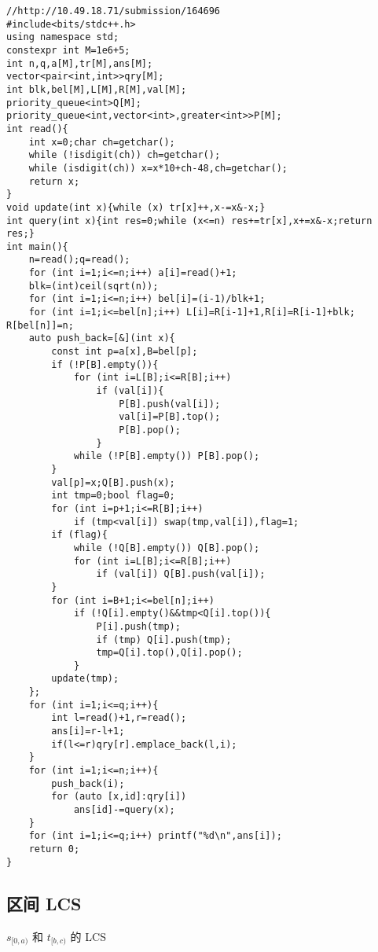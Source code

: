 \documentclass[12pt]{ctexart}
\begin{document}
\begin{lstlisting}
//http://10.49.18.71/submission/164696
#include<bits/stdc++.h>
using namespace std;
constexpr int M=1e6+5;
int n,q,a[M],tr[M],ans[M];
vector<pair<int,int>>qry[M];
int blk,bel[M],L[M],R[M],val[M];
priority_queue<int>Q[M];
priority_queue<int,vector<int>,greater<int>>P[M];
int read(){
    int x=0;char ch=getchar();
    while (!isdigit(ch)) ch=getchar();
    while (isdigit(ch)) x=x*10+ch-48,ch=getchar();
    return x;
}
void update(int x){while (x) tr[x]++,x-=x&-x;}
int query(int x){int res=0;while (x<=n) res+=tr[x],x+=x&-x;return res;}
int main(){
	n=read();q=read();
    for (int i=1;i<=n;i++) a[i]=read()+1;
	blk=(int)ceil(sqrt(n));
	for (int i=1;i<=n;i++) bel[i]=(i-1)/blk+1;
	for (int i=1;i<=bel[n];i++) L[i]=R[i-1]+1,R[i]=R[i-1]+blk; R[bel[n]]=n;
    auto push_back=[&](int x){
		const int p=a[x],B=bel[p];
		if (!P[B].empty()){
			for (int i=L[B];i<=R[B];i++)
				if (val[i]){
					P[B].push(val[i]);
					val[i]=P[B].top();
					P[B].pop();
				}
			while (!P[B].empty()) P[B].pop();
		}
		val[p]=x;Q[B].push(x);
		int tmp=0;bool flag=0;
		for (int i=p+1;i<=R[B];i++)
			if (tmp<val[i]) swap(tmp,val[i]),flag=1;
		if (flag){
			while (!Q[B].empty()) Q[B].pop();
			for (int i=L[B];i<=R[B];i++)
				if (val[i]) Q[B].push(val[i]);
		}
        for (int i=B+1;i<=bel[n];i++)
			if (!Q[i].empty()&&tmp<Q[i].top()){
				P[i].push(tmp);
				if (tmp) Q[i].push(tmp);
				tmp=Q[i].top(),Q[i].pop();
			}
		update(tmp);
	};
	for (int i=1;i<=q;i++){
		int l=read()+1,r=read();
		ans[i]=r-l+1;
		if(l<=r)qry[r].emplace_back(l,i);
	}
	for (int i=1;i<=n;i++){
		push_back(i);
		for (auto [x,id]:qry[i])
			ans[id]-=query(x);
	}
	for (int i=1;i<=q;i++) printf("%d\n",ans[i]);
    return 0;
}
\end{lstlisting}

\subsection{区间 LCS}

$s_{[0,a)}$ 和 $t_{[b,c)}$ 的 LCS
\end{document}
